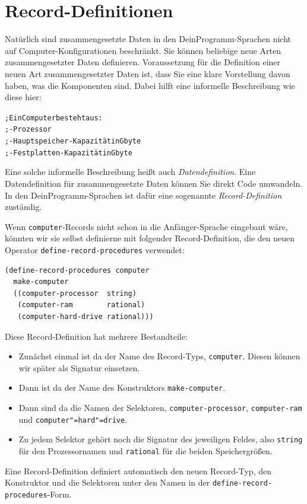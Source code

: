 \section{Record-Definitionen}
\label{sec:record-definitions}

Natürlich sind zusammengesetzte Daten in den DeinProgramm-Sprachen
nicht auf Computer-Konfigurationen beschränkt.  Sie können beliebige
neue Arten zusammengesetzter Daten definieren.  Voraussetzung für die
Definition einer neuen Art zusammengesetzter Daten ist, dass Sie eine klare
Vorstellung davon haben, was die Komponenten sind.  Dabei hilft eine
informelle Beschreibung wie diese hier:
%
\begin{alltt}
; Ein Computer besteht aus:
; - Prozessor
; - Hauptspeicher-Kapazität in Gbyte
; - Festplatten-Kapazität in Gbyte
\end{alltt}
%
Eine solche informelle Beschreibung heißt auch
\textit{Datendefinition}.  Eine Datendefinition
für zusammengesetzte Daten können Sie direkt Code umwandeln.  In den
DeinProgramm-Sprachen ist dafür eine sogenannte
\textit{Record-Definition} zuständig.

Wenn \texttt{computer}-Records nicht schon in die Anfänger-Sprache
eingebaut wäre, könnten wir sie selbst definierne mit folgender
Record-Definition, die den neuen Operator
\texttt{define-record-procedures} verwendet:
%
\begin{verbatim}
(define-record-procedures computer
  make-computer
  ((computer-processor  string)
   (computer-ram        rational)
   (computer-hard-drive rational)))
\end{verbatim}
%
Diese Record-Definition hat mehrere Bestandteile:
%
\begin{itemize}
\item Zunächst einmal ist da der Name des Record-Typs,
  \texttt{computer}.  Diesen können wir später als Signatur einsetzen.
\item Dann ist da der Name des Konstruktors \texttt{make-computer}.
\item Dann sind da die Namen der Selektoren,
  \texttt{computer-processor}, \texttt{computer-ram} und
  \texttt{computer"=hard"=drive}.
\item Zu jedem Selektor gehört noch die Signatur des jeweiligen
  Feldes, also \texttt{string} für den Prozessornamen und
  \texttt{rational} für die beiden Speichergrößen.
\end{itemize}
%
Eine Record-Definition definiert automatisch den neuen Record-Typ, den
Konstruktor und die Selektoren unter den Namen in der
\texttt{define-record-procedures}-Form.

